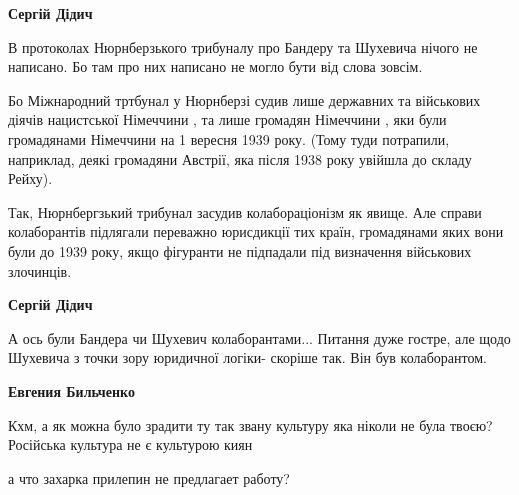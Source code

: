 \begin{itemize}
\begin{itemize}
 
\textbf{Сергій Дідич} 

В протоколах Нюрнберзького трибуналу про Бандеру та Шухевича нічого не
написано. Бо там про них написано не могло бути від слова зовсім.

Бо Міжнародний тртбунал у Нюрнберзі судив лише державних та військових діячів
нацистської Німеччини , та лише громадян Німеччини , яки були громадянами
Німеччини на 1 вересня 1939 року. (Тому туди потрапили, наприклад, деякі
громадяни Австрії, яка після 1938 року увійшла до складу Рейху).

Так, Нюрнбергзький трибунал засудив колабораціонізм як явище. Але справи
колаборантів підлягали переважно юрисдикції тих країн, громадянами яких вони
були до 1939 року, якщо фігуранти не підпадали під визначення військових
злочинців.


 
\textbf{Сергій Дідич} 

А ось були Бандера чи Шухевич колаборантами... Питання дуже гостре, але щодо
Шухевича з точки зору юридичної логіки- скоріше так. Він був колаборантом.

 
\textbf{Евгения Бильченко} 

Кхм, а як можна було зрадити ту так звану культуру яка ніколи не була твоєю?
Російська культура не є культурою киян

\end{itemize}

 
а что захарка прилепин не предлагает работу?

\begin{itemize}
 

\end{itemize}
\end{itemize}
